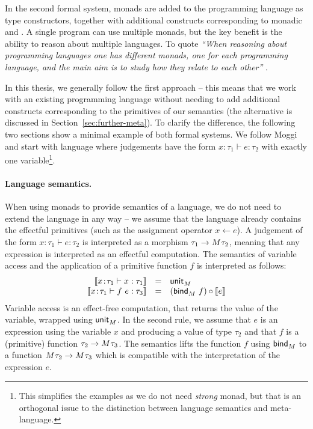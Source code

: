 In the second formal system, monads are added to the programming language as type constructors,
together with additional constructs corresponding to monadic  and .
A single program can use multiple monads, but the key benefit is the ability to reason
about multiple languages. To quote \emph{``When reasoning about programming languages one has different
monads, one for each programming language, and the main aim is to study how they relate to each
other''} \cite[p. 5]{monad-notions}.

In this thesis, we generally follow the first approach -- this means that we work with an existing
programming language without needing to add additional constructs corresponding to the primitives
of our semantics (the alternative is discussed in Section~\ref{sec:further-meta}). To clarify the
difference, the following two sections show a minimal example of both formal systems. We follow
Moggi and start with language where judgements have the form $x\!:\!\tau_1 \vdash e : \tau_2$ with
exactly one variable\footnote{This simplifies the examples as we do not need \emph{strong} monad,
but that is an orthogonal issue to the distinction between language semantics and meta-language.}.


\paragraph{Language semantics.} When using monads to provide semantics of a language, we do not
need to extend the language in any way -- we assume that the language already contains the
effectful primitives (such as the assignment operator $x \leftarrow e$). A judgement
of the form $x\!:\!\tau_1 \vdash e : \tau_2$ is interpreted as a morphism $\tau_1 \rightarrow M^{}\tau_2$,
meaning that any expression is interpreted as an effectful computation. The semantics of variable
access and the application of a primitive function $f$ is interpreted as follows:
%
\begin{equation*}
\begin{array}{rcl}
 \llbracket x\!:\!\tau_1 \vdash x : \tau_1 \rrbracket &=& \textnormal{\sffamily unit}_M^{}\\
 \llbracket x\!:\!\tau_1 \vdash f~e : \tau_3 \rrbracket &=& (\textnormal{\sffamily bind}_M^{}~f) \circ \llbracket e \rrbracket\\
\end{array}
\end{equation*}
%
Variable access is an effect-free computation, that returns the value of the variable, wrapped
using $\textnormal{\sffamily unit}_M^{}$. In the second rule, we assume that $e$ is an expression using
the variable $x$ and producing a value of type $\tau_2$ and that $f$ is a (primitive) function
$\tau_2 \rightarrow M^{}\tau_3$. The semantics lifts the function $f$ using $\textnormal{\sffamily bind}_M^{}$
to a function $M^{}\tau_2 \rightarrow M^{}\tau_3$ which is compatible with the
interpretation of the expression $e$.


